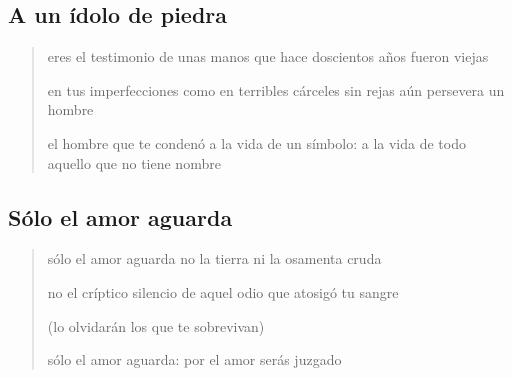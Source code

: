 \documentclass[a4paper, 12pt]{article}
\begin{document}
\pagebreak

\subsection{A un ídolo de piedra}

\begin{verse}
    
eres el testimonio de unas manos
que hace doscientos años fueron viejas
~

en tus imperfecciones
como en terribles cárceles sin rejas
aún persevera un hombre
~

el hombre que te condenó a la vida
de un símbolo: a la vida
de todo aquello que no tiene nombre
\end{verse}

\pagebreak 

\subsection{Sólo el amor aguarda}

\begin{verse}
sólo el amor aguarda 
no la tierra ni la osamenta cruda
~ 

no el críptico silencio de aquel odio 
que atosigó tu sangre
~ 

(lo olvidarán los que te sobrevivan)
~ 

sólo el amor aguarda:
por el amor serás juzgado


\end{verse}

\pagebreak 
\end{document}
